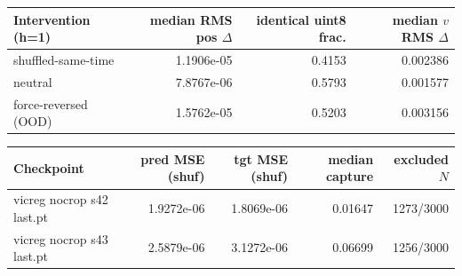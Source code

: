
\begin{tabular}{lrrr}
\toprule
Intervention (h=1) & median RMS pos $\Delta$ & identical uint8 frac. & median $v$ RMS $\Delta$ \\
\midrule
shuffled-same-time & 1.1906e-05 & 0.4153 & 0.002386 \\
neutral            & 7.8767e-06 & 0.5793 & 0.001577 \\
force-reversed (OOD) & 1.5762e-05 & 0.5203 & 0.003156 \\
\bottomrule
\end{tabular}

\begin{tabular}{lrrrr}
\toprule
Checkpoint & pred MSE (shuf) & tgt MSE (shuf) & median capture & excluded $N$ \\
\midrule
vicreg nocrop s42 last.pt & 1.9272e-06 & 1.8069e-06 & 0.01647 & 1273/3000 \\
vicreg nocrop s43 last.pt & 2.5879e-06 & 3.1272e-06 & 0.06699 & 1256/3000 \\
\bottomrule
\end{tabular}
